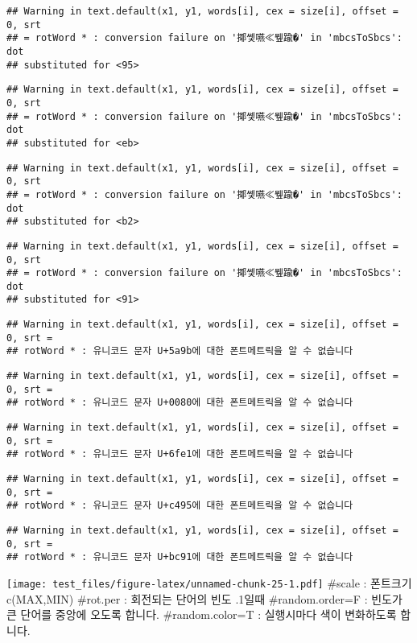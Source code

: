 \documentclass[]{article}
\begin{document}
\begin{verbatim}
## Warning in text.default(x1, y1, words[i], cex = size[i], offset = 0, srt
## = rotWord * : conversion failure on '揶쎛嚥≪뮆踰�' in 'mbcsToSbcs': dot
## substituted for <95>
\end{verbatim}

\begin{verbatim}
## Warning in text.default(x1, y1, words[i], cex = size[i], offset = 0, srt
## = rotWord * : conversion failure on '揶쎛嚥≪뮆踰�' in 'mbcsToSbcs': dot
## substituted for <eb>
\end{verbatim}

\begin{verbatim}
## Warning in text.default(x1, y1, words[i], cex = size[i], offset = 0, srt
## = rotWord * : conversion failure on '揶쎛嚥≪뮆踰�' in 'mbcsToSbcs': dot
## substituted for <b2>
\end{verbatim}

\begin{verbatim}
## Warning in text.default(x1, y1, words[i], cex = size[i], offset = 0, srt
## = rotWord * : conversion failure on '揶쎛嚥≪뮆踰�' in 'mbcsToSbcs': dot
## substituted for <91>
\end{verbatim}

\begin{verbatim}
## Warning in text.default(x1, y1, words[i], cex = size[i], offset = 0, srt =
## rotWord * : 유니코드 문자 U+5a9b에 대한 폰트메트릭을 알 수 없습니다
\end{verbatim}

\begin{verbatim}
## Warning in text.default(x1, y1, words[i], cex = size[i], offset = 0, srt =
## rotWord * : 유니코드 문자 U+0080에 대한 폰트메트릭을 알 수 없습니다
\end{verbatim}

\begin{verbatim}
## Warning in text.default(x1, y1, words[i], cex = size[i], offset = 0, srt =
## rotWord * : 유니코드 문자 U+6fe1에 대한 폰트메트릭을 알 수 없습니다
\end{verbatim}

\begin{verbatim}
## Warning in text.default(x1, y1, words[i], cex = size[i], offset = 0, srt =
## rotWord * : 유니코드 문자 U+c495에 대한 폰트메트릭을 알 수 없습니다
\end{verbatim}

\begin{verbatim}
## Warning in text.default(x1, y1, words[i], cex = size[i], offset = 0, srt =
## rotWord * : 유니코드 문자 U+bc91에 대한 폰트메트릭을 알 수 없습니다
\end{verbatim}

\texttt{[image: test\_files/figure-latex/unnamed-chunk-25-1.pdf]} \#scale
: 폰트크기 c(MAX,MIN) \#rot.per : 회전되는 단어의 빈도 .1일때
\#random.order=F : 빈도가 큰 단어를 중앙에 오도록 합니다.
\#random.color=T : 실행시마다 색이 변화하도록 합니다.
\end{document}
